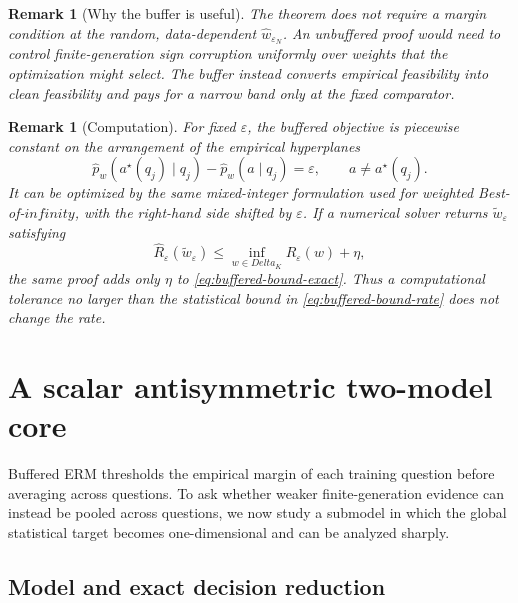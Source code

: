 \documentclass[11pt]{article}
\def\infty{infinity}%
\def\Delta{Delta}%
\newtheorem{remark}[theorem]{Remark}
\newcommand{\eps}{\varepsilon}
\begin{document}
\begin{remark}[Why the buffer is useful]
The theorem does not require a margin condition at the random, data-dependent $\widehat w_{\eps_N}$.  An unbuffered proof would need to control finite-generation sign corruption uniformly over weights that the optimization might select.  The buffer instead converts empirical feasibility into clean feasibility and pays for a narrow band only at the fixed comparator.
\end{remark}

\begin{remark}[Computation]
For fixed $\eps$, the buffered objective is piecewise constant on the arrangement of the empirical hyperplanes
\[
\widehat p_w(a^\star(q_j)\mid q_j)
-\widehat p_w(a\mid q_j)
=\eps,
\qquad a\ne a^\star(q_j).
\]
It can be optimized by the same mixed-integer formulation used for weighted Best-of-$\infty$, with the right-hand side shifted by $\eps$.  If a numerical solver returns $\widetilde w_\eps$ satisfying
\[
\widehat R_\eps(\widetilde w_\eps)
\le
\inf_{w\in\Delta_K}\widehat R_\eps(w)+\eta,
\]
the same proof adds only $\eta$ to \eqref{eq:buffered-bound-exact}.  Thus a computational tolerance no larger than the statistical bound in \eqref{eq:buffered-bound-rate} does not change the rate.
\end{remark}

\section{A scalar antisymmetric two-model core}
\label{sec:scalar-model}

Buffered ERM thresholds the empirical margin of each training question before averaging across questions.  To ask whether weaker finite-generation evidence can instead be pooled across questions, we now study a submodel in which the global statistical target becomes one-dimensional and can be analyzed sharply.

\subsection{Model and exact decision reduction}
\end{document}
